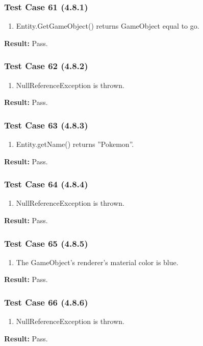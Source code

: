 \documentclass[a4paper,12pt]{article}
\begin{document}
		\subsubsection{Test Case 61 (4.8.1)}
				\begin{enumerate}
					\item Entity.GetGameObject() returns GameObject equal to go.
				\end{enumerate}
			\textbf{Result: }Pass.
		\subsubsection{Test Case 62 (4.8.2)}
				\begin{enumerate}
					\item  NullReferenceException is thrown.
				\end{enumerate}
			\textbf{Result: }Pass.
		\subsubsection{Test Case 63 (4.8.3)}
				\begin{enumerate}
					\item Entity.getName() returns ”Pokemon”.
				\end{enumerate}
			\textbf{Result: }Pass.
		\subsubsection{Test Case 64 (4.8.4)}
				\begin{enumerate}
					\item NullReferenceException is thrown.
				\end{enumerate}
			\textbf{Result: }Pass.
		\subsubsection{Test Case 65 (4.8.5)}
				\begin{enumerate}
					\item The GameObject’s renderer’s material color is blue.
				\end{enumerate}
			\textbf{Result: }Pass.
		\subsubsection{Test Case 66 (4.8.6)}
				\begin{enumerate}
					\item NullReferenceException is thrown.
				\end{enumerate}
			\textbf{Result: }Pass.
\end{document}
